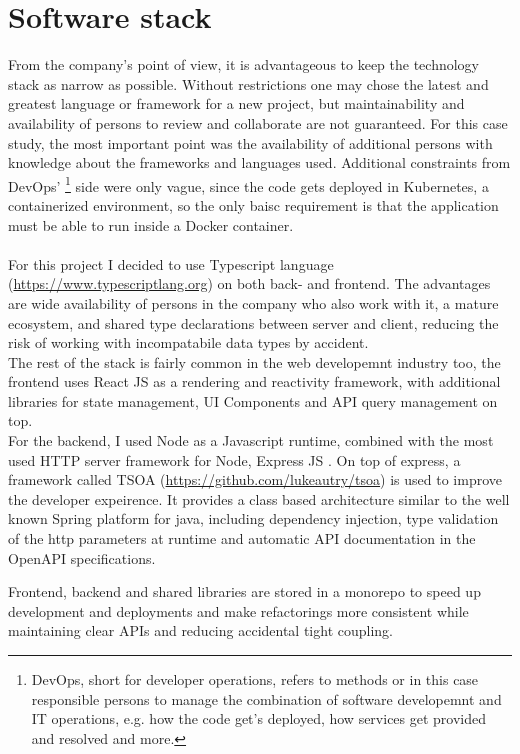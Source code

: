 \section{Software stack}
From the company's point of view, it is advantageous to keep the technology stack as narrow as possible.
Without restrictions one may chose the latest and greatest language or framework for a new project, but maintainability and availability of persons to review and collaborate are not guaranteed.
For this case study, the most important point was the availability of additional persons with knowledge about the frameworks and languages used. Additional constraints from DevOps'
\footnote{DevOps, short for developer operations, refers to methods or in this case responsible persons to manage the combination of software developemnt and IT operations, e.g. how the code get's deployed, how services get provided and resolved and more.} side were only vague,
since the code gets deployed in Kubernetes, a containerized environment, so the only baisc requirement is that the application must be able to run inside a Docker container.
\\\\
For this project I decided to use Typescript language (\url{https://www.typescriptlang.org}) on both back- and frontend.
The advantages are wide availability of persons in the company who also work with it, a mature ecosystem, and shared type declarations between server and client,
reducing the risk of working with incompatabile data types by accident.
\\
The rest of the stack is fairly common in the web developemnt industry too, the frontend uses React JS as a rendering and reactivity framework,
with additional libraries for state management, UI Components and API query management on top.
\\
For the backend, I used Node as a Javascript runtime, combined with the most used HTTP server framework for Node, Express JS \cite{Github:VanoDevium/node-framework-stars}.
On top of express, a framework called TSOA (\url{https://github.com/lukeautry/tsoa}) is used to improve the developer expeirence. It provides a class based architecture similar
to the well known Spring platform for java, including dependency injection, type validation of the http parameters at runtime and automatic API documentation in the OpenAPI specifications.

Frontend, backend and shared libraries are stored in a monorepo to speed up development and deployments and make refactorings more consistent while maintaining clear APIs and reducing accidental tight coupling.

